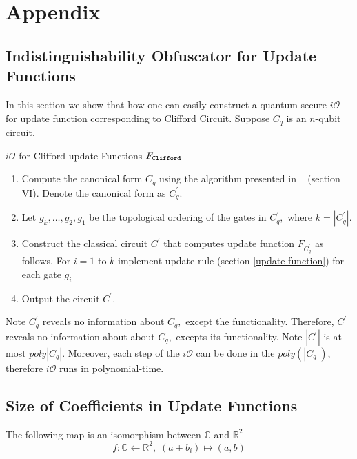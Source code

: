 \section{Appendix}
\label{sec:appendix}
 \subsection{Indistinguishability Obfuscator for Update Functions}
 \label{sec: iO-clifford-functions}
 In this section we show that how one can easily construct a quantum secure $i\mathcal{O}$ for update function corresponding to Clifford Circuit. Suppose $C_q$ is an $n$-qubit circuit.
\begin{algorithm}[H]
  \caption{$i\mathcal{O}$ for Clifford update Functions $F_{\tt Clifford}$}
  \begin{enumerate}
  \item Compute the canonical form $C_q$ using the algorithm presented in ~\cite{AG04} (section VI). Denote the canonical form as $C_q^\prime.$
  \item Let $g_k, \ldots,g_2,g_1$ be the topological ordering of the gates in $C_q^\prime,$ where $k=|C_q^\prime|.$
  \item Construct the classical circuit $C^\prime$ that computes update function $F_{C_q^\prime}$ as follows. For $i=1$ to $k$ implement update rule (section \ref{update function})  for each gate $g_i$
  \item Output the circuit $C^\prime.$
  \end{enumerate}
\end{algorithm}

\noindent Note $C_q^\prime$ reveals no information about $C_q,$ except the functionality. Therefore, $C^\prime$ reveals no information about about $C_q,$ excepts its functionality. Note $|C^\prime|$ is at most $poly|C_q|.$ Moreover, each step of the $i\mathcal{O}$ can be done in the $poly(|C_q|),$ therefore $i\mathcal{O}$ runs in polynomial-time.



 \subsection{Size of Coefficients in Update Functions}
 \label{coeff:size}
The following map is an isomorphism between $\mathbb{C}$ and $\mathbb{R}^2$
 \begin{equation}
  \label{size:map:real-complex)}
  f:\mathbb{C}\leftarrow \mathbb{R}^2, \; (a+b_i)\mapsto (a,b)
\end{equation}

